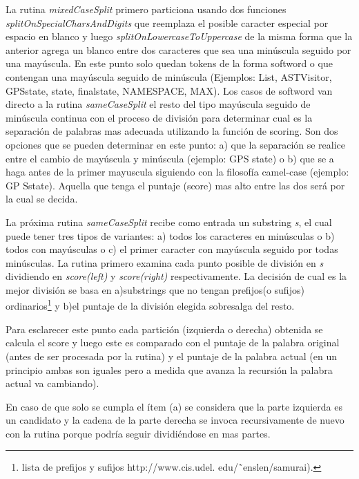 \documentclass[12pt]{report}
\begin{document}
La rutina \textit{mixedCaseSplit} primero particiona usando dos funciones \textit{splitOnSpecialCharsAndDigits} que reemplaza el posible caracter especial por espacio en blanco y luego \textit{splitOnLowercaseToUppercase} de la misma forma que la anterior agrega un blanco entre dos caracteres que sea una minúscula seguido por una mayúscula. En este punto solo quedan tokens de la forma softword o que contengan una mayúscula seguido de minúscula (Ejemplos: \textsf{List, ASTVisitor, GPSstate, state, finalstate, NAMESPACE, MAX}). Los casos de softword van directo a la rutina \textit{sameCaseSplit} el resto del tipo mayúscula seguido de minúscula continua con el proceso de división para determinar cual es la separación de palabras mas adecuada utilizando la función de scoring. Son dos opciones que se pueden determinar en este punto: a) que la separación se realice entre el cambio de mayúscula y minúscula (ejemplo: \textsf{GPS state}) o b) que se a haga antes de la primer mayuscula siguiendo con la filosofía camel-case (ejemplo: \textsf{GP Sstate}). Aquella que tenga el puntaje (score) mas alto entre las dos será por la cual se decida\cite{EHPV09}.

La próxima rutina \textit{sameCaseSplit} recibe como entrada un substring \textit{s}, el cual puede tener tres tipos de variantes: a) todos los caracteres en minúsculas o b) todos con mayúsculas o c) el primer caracter con mayúscula seguido por todas minúsculas. La rutina primero examina cada punto posible de división en \textit{s} dividiendo en \textit{score(left)} y \textit{score(right)} respectivamente. La decisión de cual es la mejor división se basa en a)substrings que no tengan prefijos(o sufijos) ordinarios\footnote[1]{lista de prefijos y sufijos http://www.cis.udel.
edu/˜enslen/samurai).} y b)el puntaje de la división elegida sobresalga del resto\cite{EHPV09}. 

Para esclarecer este punto cada partición (izquierda o derecha) obtenida se calcula el score y luego este es comparado con el puntaje de la palabra original (antes de ser procesada por la rutina) y el puntaje de la palabra actual (en un principio ambas son iguales pero a medida que avanza la recursión la palabra actual va cambiando)\cite{EHPV09}.

En caso de que solo se cumpla el ítem (a) se considera que la parte izquierda es un candidato y la cadena de la parte derecha se invoca recursivamente de nuevo con la rutina porque podría seguir dividiéndose en mas partes.
\end{document}
